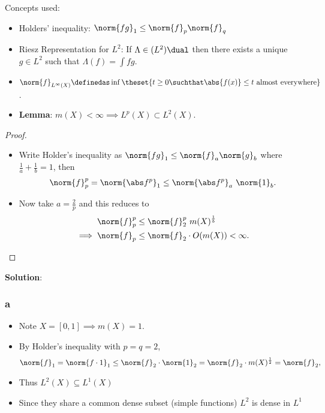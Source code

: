 \begin{solution}

Concepts used:

\begin{itemize}
\tightlist
\item
  Holders' inequality: \(\norm{fg}_1 \leq \norm{f}_p \norm{f}_q\)
\item
  Riesz Representation for \(L^2\): If \(\Lambda \in (L^2)\dual\) then
  there exists a unique \(g\in L^2\) such that \(\Lambda(f) = \int fg\).
\item
  \(\norm{f}_{L^\infty(X)} \definedas \inf \theset{t\geq 0 \suchthat \abs{f(x)} \leq t \text{ almost everywhere} }\).
\item
  \textbf{Lemma}: \(m(X) < \infty \implies L^p(X) \subset L^2(X)\).
\end{itemize}

\begin{proof}

\hfill

\begin{itemize}
\item
  Write Holder's inequality as
  \(\norm{fg}_1 \leq \norm{f}_a \norm{g}_b\) where
  \(\frac 1 a + \frac 1 b = 1\), then
  \begin{align*}
  \norm{f}_p^p = \norm{\abs f^p}_1 \leq \norm{\abs f^p}_a ~\norm{1}_b
  .\end{align*}
\item
  Now take \(a = \frac 2 p\) and this reduces to
  \begin{align*}
  \norm{f}_p^p &\leq \norm{f}_2^p ~m(X)^{\frac 1 b} \\
  \implies \norm{f}_p &\leq \norm{f}_2 \cdot O(m(X)) < \infty
  .\end{align*}
\end{itemize}

\end{proof}

\textbf{Solution}:

\hypertarget{a-22}{%
\subsubsection{a}\label{a-22}}

\begin{itemize}
\item
  Note \(X = [0, 1] \implies m(X) = 1\).
\item
  By Holder's inequality with \(p=q=2\),
  \begin{align*}
  \norm{f}_1 = \norm{f\cdot 1}_1 \leq \norm{f}_2 \cdot \norm{1}_2 = \norm{f}_2 \cdot m(X)^{\frac 1 2} = \norm{f}_2,
  \end{align*}
\item
  Thus \(L^2(X) \subseteq L^1(X)\)
\item
  Since they share a common dense subset (simple functions) \(L^2\) is
  dense in \(L^1\) 
\end{itemize}


\end{solution}
